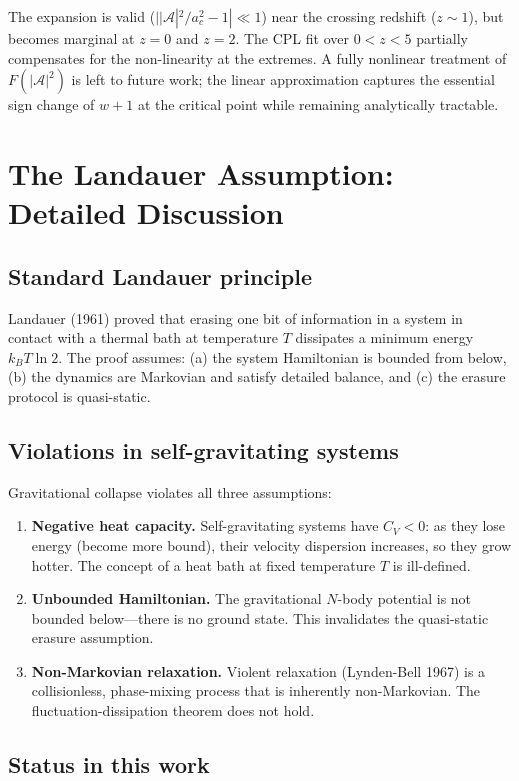 \documentclass[aps,prd,onecolumn]{revtex4-2}
\begin{document}
The expansion is valid ($||\mathcal{A}|^2/a_c^2 - 1| \ll 1$) near the crossing redshift ($z \sim 1$), but becomes marginal at $z=0$ and $z=2$. The CPL fit over $0 < z < 5$ partially compensates for the non-linearity at the extremes. A fully nonlinear treatment of $F(|\mathcal{A}|^2)$ is left to future work; the linear approximation captures the essential sign change of $w+1$ at the critical point while remaining analytically tractable.

\section{The Landauer Assumption: Detailed Discussion}

\subsection{Standard Landauer principle}

Landauer (1961) proved that erasing one bit of information in a system in contact with a thermal bath at temperature $T$ dissipates a minimum energy $k_B T \ln 2$. The proof assumes: (a) the system Hamiltonian is bounded from below, (b) the dynamics are Markovian and satisfy detailed balance, and (c) the erasure protocol is quasi-static.

\subsection{Violations in self-gravitating systems}

Gravitational collapse violates all three assumptions:
\begin{enumerate}
\item \textbf{Negative heat capacity.} Self-gravitating systems have $C_V < 0$: as they lose energy (become more bound), their velocity dispersion increases, so they grow hotter. The concept of a heat bath at fixed temperature $T$ is ill-defined.
\item \textbf{Unbounded Hamiltonian.} The gravitational $N$-body potential is not bounded below---there is no ground state. This invalidates the quasi-static erasure assumption.
\item \textbf{Non-Markovian relaxation.} Violent relaxation (Lynden-Bell 1967) is a collisionless, phase-mixing process that is inherently non-Markovian. The fluctuation-dissipation theorem does not hold.
\end{enumerate}

\subsection{Status in this work}
\end{document}
